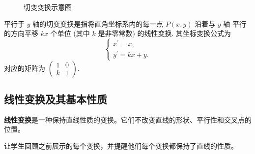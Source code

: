 \documentclass[lang=cn,newtx,10pt,scheme=chinese]{elegantbook}
\begin{document}
\begin{figure}[h]
\centering
{}
\caption{切变变换示意图\label{fig:切变变换}}
\end{figure}

\begin{exercise}

    平行于 $y$ 轴的切变变换是指将直角坐标系内的每一点 $P(x, y)$ 沿着与 $y$ 轴 平行的方向平移 $k x$ 个单位 (其中 $k$ 是非零常数) 的线性变换. 其坐标变换公式为
    $$
    \left\{\begin{array}{c}
    x^{\prime}=x, \\
    y^{\prime}=k x+y .
    \end{array}\right.
    $$
    对应的矩阵为 $\left(\begin{array}{ll}1 & 0 \\ k & 1\end{array}\right)$.
        
\end{exercise}

\subsection{线性变换及其基本性质}

\begin{definition}[线性变换]
  \textcolor{third}{\bf 线性变换}是一种保持直线性质的变换。它们不改变直线的形状、平行性和交叉点的位置。
\end{definition}

\begin{note}
  让学生回顾之前展示的每个变换，并提醒他们每个变换都保持了直线的性质。
\end{note}
\end{document}
